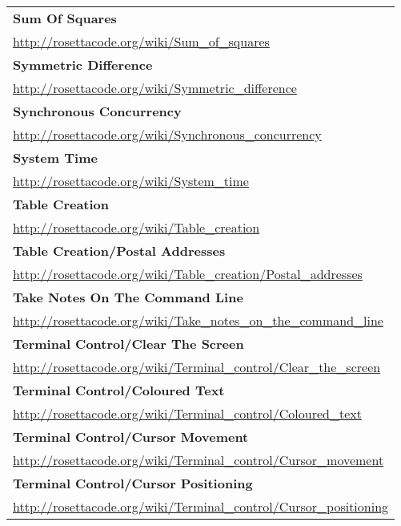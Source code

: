 \begin{longtable}{l}
\textbf{Sum Of Squares } \\ \href{http://rosettacode.org/wiki/Sum\_of\_squares}{http://rosettacode.org/wiki/Sum\_of\_squares} \\
\textbf{Symmetric Difference } \\ \href{http://rosettacode.org/wiki/Symmetric\_difference}{http://rosettacode.org/wiki/Symmetric\_difference} \\
\textbf{
Synchronous Concurrency } \\ \href{http://rosettacode.org/wiki/Synchronous\_concurrency}{http://rosettacode.org/wiki/Synchronous\_concurrency} \\
\textbf{System Time } \\ \href{http://rosettacode.org/wiki/System\_time}{http://rosettacode.org/wiki/System\_time} \\
\textbf{Table Creation } \\ \href{http://rosettacode.org/wiki/Table\_creation}{http://rosettacode.org/wiki/Table\_creation} \\
\textbf{
Table Creation/Postal Addresses } \\ \href{http://rosettacode.org/wiki/Table\_creation/Postal\_addresses}{http://rosettacode.org/wiki/Table\_creation/Postal\_addresses} \\
\textbf{Take Notes On The Command Line } \\ \href{http://rosettacode.org/wiki/Take\_notes\_on\_the\_command\_line}{http://rosettacode.org/wiki/Take\_notes\_on\_the\_command\_line} \\
\textbf{
Terminal Control/Clear The Screen } \\ \href{http://rosettacode.org/wiki/Terminal\_control/Clear\_the\_screen}{http://rosettacode.org/wiki/Terminal\_control/Clear\_the\_screen} \\
\textbf{Terminal Control/Coloured Text } \\ \href{http://rosettacode.org/wiki/Terminal\_control/Coloured\_text}{http://rosettacode.org/wiki/Terminal\_control/Coloured\_text} \\
\textbf{
Terminal Control/Cursor Movement } \\ \href{http://rosettacode.org/wiki/Terminal\_control/Cursor\_movement}{http://rosettacode.org/wiki/Terminal\_control/Cursor\_movement} \\
\textbf{
Terminal Control/Cursor Positioning } \\ \href{http://rosettacode.org/wiki/Terminal\_control/Cursor\_positioning}{http://rosettacode.org/wiki/Terminal\_control/Cursor\_positioning} \\

\end{longtable}
